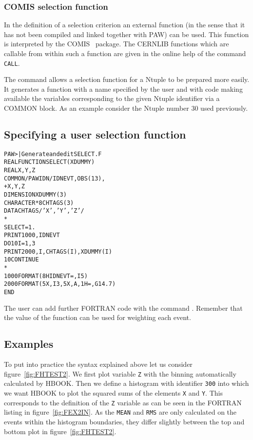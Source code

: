 \subsubsection{COMIS selection function}


In the definition of a selection criterion an external function (in the sense 
that it has not been compiled and linked together with PAW) can be used. This 
function is interpreted by the COMIS~\cite{bib-COMIS} package. The CERNLIB
functions which are callable from within such a function are given in the
online help of the command \texttt{CALL}.

The command 
allows a selection function for a Ntuple to be prepared more easily.
It generates a function with a name specified by the user and with
code making available the variables corresponding to
the given Ntuple identifier via a COMMON block.
As an example consider the Ntuple number 30 used previously.

\subsection*{Specifying a user selection function}
\begin{alltt}
 PAW >    | Generate and edit SELECT.F
      REAL FUNCTION SELECT(XDUMMY)
      REAL X    ,   Y    ,   Z
      COMMON/PAWIDN/IDNEVT,OBS(13),
     +    X    ,   Y    ,   Z
      DIMENSION XDUMMY(  3)
      CHARACTER*8 CHTAGS(  3)
      DATA CHTAGS/'   X    ','   Y    ','   Z    '/
*
      SELECT=1.
      PRINT 1000,IDNEVT
      DO 10 I=1,  3
         PRINT 2000,I,CHTAGS(I),XDUMMY(I)
  10  CONTINUE
*
 1000 FORMAT(8H IDNEVT=,I5)
 2000 FORMAT(5X,I3,5X,A,1H=,G14.7)
      END
\end{alltt}

The user can add further FORTRAN code with the command .
Remember that the value of the function can be used for weighting each event.

\subsection{Examples}

To put into practice the syntax explained above let us consider 
figure~\ref{fig:FHTEST2}. We first plot variable \texttt{Z} with the binning 
automatically calculated by HBOOK. Then we define a histogram with identifier 
\texttt{300} into which we want HBOOK to plot the squared sums of the elements 
\texttt{X} and \texttt{Y}. This corresponds to the definition of the \texttt{Z} 
variable as can be seen in the FORTRAN listing in figure~\ref{fig:FEX2IN}. As 
the \texttt{MEAN} and \texttt{RMS} are only calculated on the events within the 
histogram boundaries, they differ slightly between the top and bottom plot in 
figure~\ref{fig:FHTEST2}.

